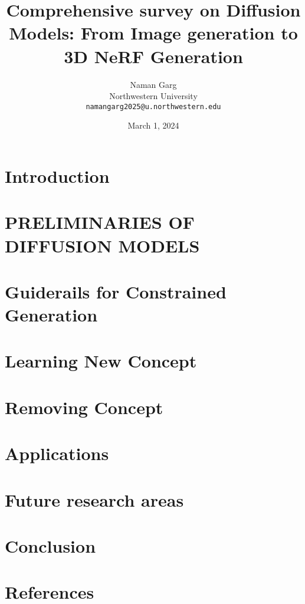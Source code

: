 \documentclass[12pt]{article}
\begin{document}
\title{Comprehensive survey on Diffusion Models: From Image generation to 3D NeRF Generation}
\author{Naman Garg\\
\small Northwestern University\\
\small \texttt{namangarg2025@u.northwestern.edu}}
\date{March 1, 2024}
\maketitle

\begin{abstract}

\end{abstract}

\section{Introduction}


\section{PRELIMINARIES OF DIFFUSION MODELS}





\section{Guiderails for Constrained Generation}


\section{Learning New Concept}


\section{Removing Concept}



\section{Applications}


\section{Future research areas}


\section{Conclusion}



\section*{References}

\printbibliography[heading=none]
\end{document}
